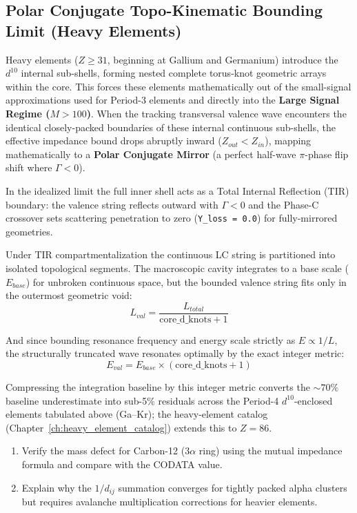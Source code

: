 \subsection*{Polar Conjugate Topo-Kinematic Bounding Limit (Heavy Elements)}

Heavy elements ($Z \geq 31$, beginning at Gallium and Germanium) introduce the $d^{10}$ internal sub-shells, forming nested complete torus-knot geometric arrays within the core. This forces these elements mathematically out of the small-signal approximations used for Period-3 elements and directly into the \textbf{Large Signal Regime ($M > 100$)}. When the tracking transversal valence wave encounters the identical closely-packed boundaries of these internal continuous sub-shells, the effective impedance bound drops abruptly inward ($Z_{out} < Z_{in}$), mapping mathematically to a \textbf{Polar Conjugate Mirror} (a perfect half-wave $\pi$-phase flip shift where $\Gamma < 0$).

In the idealized limit the full inner shell acts as a Total Internal Reflection (TIR) boundary: the valence string reflects outward with $\Gamma < 0$ and the Phase-C crossover sets scattering penetration to zero (\texttt{Y\_loss = 0.0}) for fully-mirrored geometries.

Under TIR compartmentalization the continuous LC string is partitioned into isolated topological segments. The macroscopic cavity integrates to a base scale ($E_{base}$) for unbroken continuous space, but the bounded valence string fits only in the outermost geometric void:
\begin{equation}
    L_{val} = \frac{L_{total}}{\text{core\_d\_knots} + 1}
\end{equation}

And since bounding resonance frequency and energy scale strictly as $E \propto 1/L$, the structurally truncated wave resonates optimally by the exact integer metric:
\begin{equation}
    \boxed{E_{val} = E_{base} \times (\text{core\_d\_knots} + 1)}
\end{equation}

Compressing the integration baseline by this integer metric converts the $\sim 70\%$ baseline underestimate into sub-5\% residuals across the Period-4 $d^{10}$-enclosed elements tabulated above (Ga--Kr); the heavy-element catalog (Chapter~\ref{ch:heavy_element_catalog}) extends this to $Z = 86$.

\begin{exercisebox}
\begin{enumerate}
    \item Verify the mass defect for Carbon-12 ($3\alpha$ ring) using the mutual impedance formula and compare with the CODATA value.
    \item Explain why the $1/d_{ij}$ summation converges for tightly packed alpha clusters but requires avalanche multiplication corrections for heavier elements.
\end{enumerate}
\end{exercisebox}

